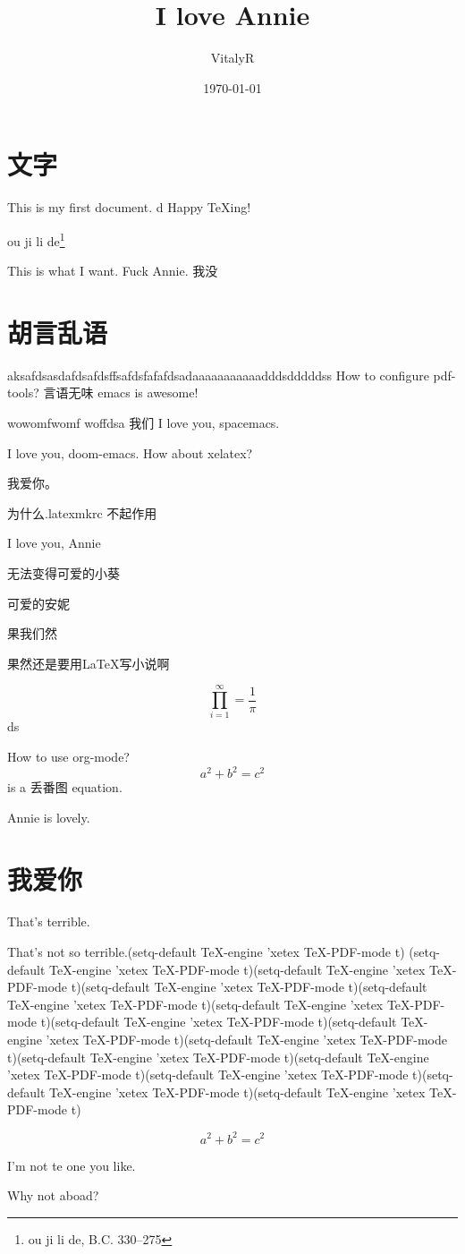 \documentclass[UTF8]{ctexart}
\title{I love Annie}
\author{VitalyR}
\date{\today}
\begin{document}
\maketitle
\tableofcontents

\section{文字}
This is my first document.
d
Happy \TeX ing!

ou ji li de\footnote{ou ji li de, B.C. 330--275}

This is what I want.
Fuck Annie.
我没 

\section{胡言乱语}

aksafdsasdafdsafdsffsafdsfafafdsadaaaaaaaaaaadddsdddddss
How to configure pdf-tools?
言语无味
emacs is awesome!

wowomfwomf woffdsa
我们
I love you, spacemacs.

I love you, doom-emacs.
How about xelatex?

我爱你。

为什么.latexmkrc 不起作用

I love you, Annie

无法变得可爱的小葵

可爱的安妮

果我们然

果然还是要用\LaTeX 写小说啊


\begin{equation}
  \prod_{i=1}^{\infty}=\frac{1}{\pi}
  \end{equation}
  ds

How to use org-mode?
\[a^{2}+b^{2}=c^{2}\] is a 丢番图 equation.


Annie is lovely.




\section{我爱你}
That's terrible.

That's not so terrible.(setq-default TeX-engine 'xetex
              TeX-PDF-mode t)
(setq-default TeX-engine 'xetex
              TeX-PDF-mode t)(setq-default TeX-engine 'xetex
              TeX-PDF-mode t)(setq-default TeX-engine 'xetex
              TeX-PDF-mode t)(setq-default TeX-engine 'xetex
              TeX-PDF-mode t)(setq-default TeX-engine 'xetex
              TeX-PDF-mode t)(setq-default TeX-engine 'xetex
              TeX-PDF-mode t)(setq-default TeX-engine 'xetex
              TeX-PDF-mode t)(setq-default TeX-engine 'xetex
              TeX-PDF-mode t)(setq-default TeX-engine 'xetex
              TeX-PDF-mode t)(setq-default TeX-engine 'xetex
              TeX-PDF-mode t)(setq-default TeX-engine 'xetex
              TeX-PDF-mode t)(setq-default TeX-engine 'xetex
              TeX-PDF-mode t)(setq-default TeX-engine 'xetex
              TeX-PDF-mode t)

\begin{equation}
\label{eq:2}
a^{2}+b^{2}=c^{2}
\end{equation}


I'm not te one you like.

Why not aboad?
\end{document}
